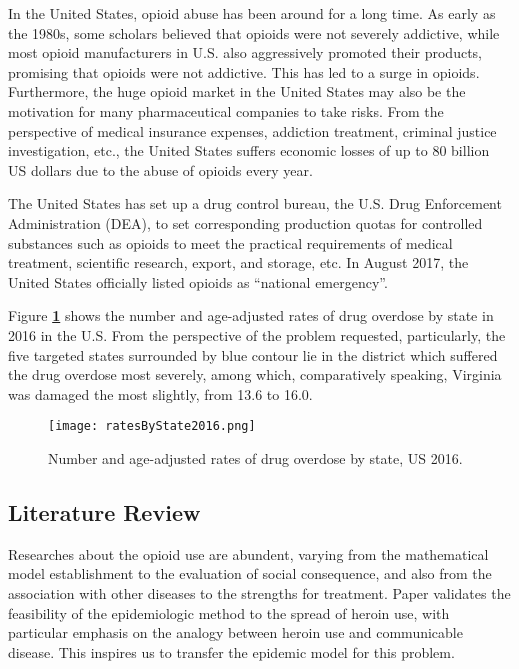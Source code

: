 In the United States, opioid abuse has been around for a long time. As early as the 1980s, some scholars believed that opioids were not severely addictive, while most opioid manufacturers in U.S. also aggressively promoted their products, promising that opioids were not addictive. This has led to a surge in opioids. Furthermore, the huge opioid market in the United States may also be the motivation for many pharmaceutical companies to take risks. From the perspective of medical insurance expenses, addiction treatment, criminal justice investigation, etc., the United States suffers economic losses of up to 80 billion US dollars due to the abuse of opioids every year.

The United States has set up a drug control bureau, the U.S. Drug Enforcement Administration (DEA), to set corresponding production quotas for controlled substances such as opioids to meet the practical requirements of medical treatment, scientific research, export, and storage, etc. In August 2017, the United States officially listed opioids as “national emergency”.

Figure \textbf{\ref{ratesByState2016}} shows the number and age-adjusted rates of drug overdose by state in 2016 in the U.S. From the perspective of the problem requested, particularly, the five targeted states surrounded by blue contour lie in the district which suffered the drug overdose most severely, among which, comparatively speaking, Virginia was damaged the most slightly, from 13.6 to 16.0.
\begin{figure}
	\centering
	\texttt{[image: ratesByState2016.png]}
	\caption{Number and age-adjusted rates of drug overdose by state, US 2016.}
	\label{ratesByState2016}
\end{figure}


\subsection{Literature Review}
Researches about the opioid use are abundent, varying from the mathematical model establishment to the evaluation of social consequence, and also from the association with other diseases to the strengths for treatment.
Paper \cite{3} validates the feasibility of the epidemiologic method to the spread of heroin use, with particular emphasis on the analogy between heroin use and communicable disease. This inspires us to transfer the epidemic model for this problem.

